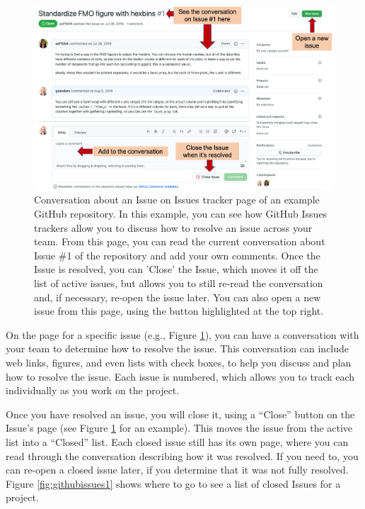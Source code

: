 \documentclass[]{tufte-book}
\begin{document}
\begin{figure}
\includegraphics[width=\textwidth]{figures/github_issues2} \caption[Conversation about an Issue on Issues tracker page of an example GitHub repository]{Conversation about an Issue on Issues tracker page of an example GitHub repository. In this example, you can see how GitHub Issues trackers allow you to discuss how to resolve an issue across your team. From this page, you can read the current conversation about Issue \#1 of the repository and add your own comments. Once the Issue is resolved, you can 'Close' the Issue, which moves it off the list of active issues, but allows you to still re-read the conversation and, if necessary, re-open the issue later. You can also open a new issue from this page, using the button highlighted at the top right.}\label{fig:githubissues2}
\end{figure}

On the page for a specific issue (e.g., Figure \ref{fig:githubissues2}), you
can have a conversation with your team to determine how to resolve the issue.
This conversation can include web links, figures, and even lists with check boxes, to
help you discuss and plan how to resolve the issue. Each issue is numbered,
which allows you to track each individually as you work on the project.

Once you have resolved an issue, you will close it, using a ``Close'' button on the
Issue's page (see Figure \ref{fig:githubissues2} for an example). This moves the issue
from the active list into a ``Closed'' list. Each closed issue still has its
own page, where you can read through the conversation describing how it
was resolved. If you need to, you can re-open a closed issue later, if you
determine that it was not fully resolved. Figure \ref{fig:githubissues1} shows
where to go to see a list of closed Issues for a project.
\end{document}
